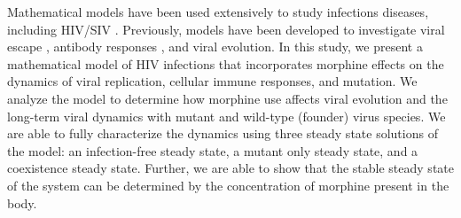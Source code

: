 \documentclass[11pt, oneside]{article}    %
\begin{document}
Mathematical models have been used extensively to study infections diseases, including HIV/SIV \cite{Perelson, Chubb, Konrad, Conway, Schwartz, Vaidya, Mutua, Ganusov2006, Ganusov2011, Ganusov2013}. Previously, models have been developed to investigate viral escape \cite{Ganusov2006, Ganusov2011, Ganusov2013}, antibody responses \cite{Mutua}, and viral evolution\cite{Konrad}. In this study, we present a mathematical model of HIV infections that incorporates morphine effects on the dynamics of viral replication, cellular immune responses, and mutation. We analyze the model to determine how morphine use affects viral evolution and the long-term viral dynamics with mutant and wild-type (founder) virus species. We are able to fully characterize the dynamics using three steady state solutions of the model: an infection-free steady state, a mutant only steady state, and a coexistence steady state. Further, we are able to show that the stable steady state of the system can be determined by the concentration of morphine present in the body.


\vspace{5mm}

	
\end{document}
